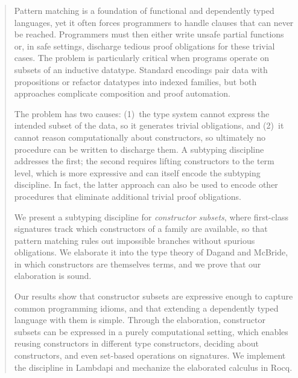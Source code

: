 \begin{abstract}
Pattern matching is a foundation of functional and dependently typed languages, yet it often forces programmers to handle clauses that can never be reached.
Programmers must then either write unsafe partial functions or, in safe settings, discharge tedious proof obligations for these trivial cases.
The problem is particularly critical when programs operate on subsets of an inductive datatype.
Standard encodings pair data with propositions or refactor datatypes into indexed families, but both approaches complicate composition and proof automation.

The problem has two causes:
(1)~the type system cannot express the intended subset of the data, so it generates trivial obligations, and
(2)~it cannot reason computationally about constructors, so ultimately no procedure can be written to discharge them.
A subtyping discipline addresses the first; the second requires lifting constructors to the term level, which is more expressive and can itself encode the subtyping discipline.
In fact, the latter approach can also be used to encode other procedures that eliminate additional trivial proof obligations.

We present a subtyping discipline for \emph{constructor subsets}, where first-class signatures track which constructors of a family are available, so that pattern matching rules out impossible branches without spurious obligations.
We elaborate it into the type theory of Dagand and McBride, in which constructors are themselves terms, and we prove that our elaboration is sound.

Our results show that constructor subsets are expressive enough to capture common programming idioms, and that extending a dependently typed language with them is simple.
Through the elaboration, constructor subsets can be expressed in a purely computational setting, which enables reusing constructors in different type constructors, deciding about constructors, and even set-based operations on signatures.
We implement the discipline in Lambdapi and mechanize the elaborated calculus in Rocq.
\end{abstract}
